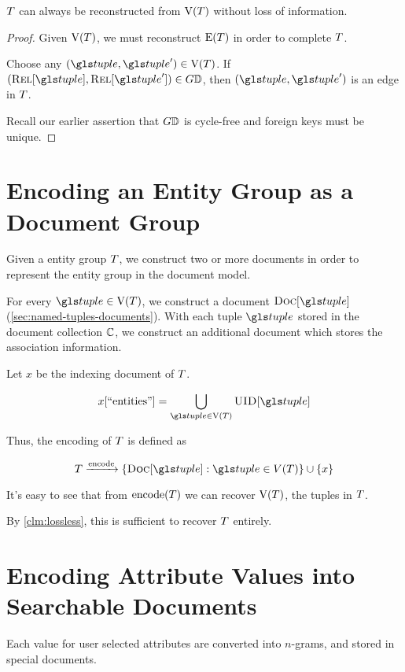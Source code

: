 		\begin{claim}
		\label{clm:lossless}
			\(T\) can always be reconstructed from \(\text{V}(T)\) without loss of information.
		\end{claim}
		
		\begin{proof}
			Given \(\text{V}(T)\), we must reconstruct \(\text{E}(T)\) in order to complete \(T\).
			
			Choose any \((\tuple, \tuple') \in \text{V}(\egraph)\).	If \((\relations{\tuple}, \relations{\tuple'}) \in \sgraph{\db}\), then \((\tuple, \tuple')\) is an edge in \(T\).
			
			Recall our earlier assertion that \(G{\mathbb{D}}\) is cycle-free and foreign keys must be unique.
		\end{proof}
		
	\section{Encoding an Entity Group as a Document Group}
		Given a entity group \(T\), we construct two or more documents in order to represent the entity group in the document model.
		
		For every \(\tuple \in \text{V}(\egraph)\), we construct a document \(\docs{\tuple}\) (\vref{sec:named-tuples-documents}).  With each tuple \(\tuple\) stored in the document collection \(\mathbb{C}\), we construct an additional document which stores the association information.
		
		Let \(x\) be the indexing document of \(T\).
		
		\[
			x[\text{``entities''}] = \bigcup_{\tuple \in \text{V}\left(\egraph\right)} \uid{\tuple}
		\]
		
		Thus, the encoding of \(T\) is defined as
		
		\[
			\egraph \xrightarrow{\text{encode}} \{\docs{\tuple} : \tuple \in V(\egraph)\} \cup \{x\}
		\]
		
		It's easy to see that from \(\text{encode}(T)\) we can recover \(\text{V}(T)\), the tuples in \(T\).
		
		By \vref{clm:lossless}, this is sufficient to recover \(T\) entirely.
	
	\section{Encoding Attribute Values into Searchable Documents}
		Each value for user selected attributes are converted into \(n\)-grams, and stored in special documents.
	
